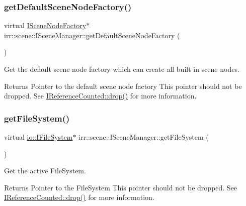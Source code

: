\subsubsection{\texorpdfstring{get\+Default\+Scene\+Node\+Factory()}{getDefaultSceneNodeFactory()}\hspace{0.1cm}{\footnotesize\ttfamily [2/2]}}
{\footnotesize\ttfamily virtual \hyperlink{classirr_1_1scene_1_1ISceneNodeFactory}{I\+Scene\+Node\+Factory}$\ast$ irr\+::scene\+::\+I\+Scene\+Manager\+::get\+Default\+Scene\+Node\+Factory (\begin{DoxyParamCaption}{ }\end{DoxyParamCaption})\hspace{0.3cm}{\ttfamily [pure virtual]}}



Get the default scene node factory which can create all built in scene nodes. 

\begin{DoxyReturn}{Returns}
Pointer to the default scene node factory This pointer should not be dropped. See \hyperlink{classirr_1_1IReferenceCounted_a03856a09355b89d178090c4a5f738543}{I\+Reference\+Counted\+::drop()} for more information. 
\end{DoxyReturn}
\mbox{\label{classirr_1_1scene_1_1ISceneManager_adbd98fbeba199005cf795a5bae7ccbaf}} 
\subsubsection{\texorpdfstring{get\+File\+System()}{getFileSystem()}\hspace{0.1cm}{\footnotesize\ttfamily [1/2]}}
{\footnotesize\ttfamily virtual \hyperlink{classirr_1_1io_1_1IFileSystem}{io\+::\+I\+File\+System}$\ast$ irr\+::scene\+::\+I\+Scene\+Manager\+::get\+File\+System (\begin{DoxyParamCaption}{ }\end{DoxyParamCaption})\hspace{0.3cm}{\ttfamily [pure virtual]}}



Get the active File\+System. 

\begin{DoxyReturn}{Returns}
Pointer to the File\+System This pointer should not be dropped. See \hyperlink{classirr_1_1IReferenceCounted_a03856a09355b89d178090c4a5f738543}{I\+Reference\+Counted\+::drop()} for more information. 
\end{DoxyReturn}
\mbox{\label{classirr_1_1scene_1_1ISceneManager_adbd98fbeba199005cf795a5bae7ccbaf}} 

